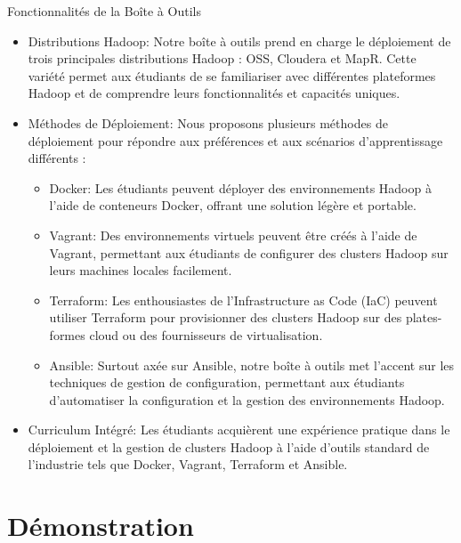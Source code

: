 \documentclass[tiny]{beamer}
\begin{document}
\begin{frame}[allowframebreaks, labels=]{Fonctionnalités de la Boîte à Outils}
\begin{itemize}
\item \alert{Distributions Hadoop:} Notre boîte à outils prend en charge le déploiement
de trois principales distributions Hadoop : OSS, Cloudera et MapR. Cette
variété permet aux étudiants de se familiariser avec différentes
plateformes Hadoop et de comprendre leurs fonctionnalités et capacités
uniques.
\item \alert{Méthodes de Déploiement:} Nous proposons plusieurs méthodes de déploiement
pour répondre aux préférences et aux scénarios d'apprentissage différents :
\begin{itemize}
\item \alert{Docker:} Les étudiants peuvent déployer des environnements Hadoop à l'aide
de conteneurs Docker, offrant une solution légère et portable.
\item \alert{Vagrant:} Des environnements virtuels peuvent être créés à l'aide de
Vagrant, permettant aux étudiants de configurer des clusters Hadoop sur
leurs machines locales facilement.
\item \alert{Terraform:} Les enthousiastes de l'Infrastructure as Code (IaC) peuvent
utiliser Terraform pour provisionner des clusters Hadoop sur des
plates-formes cloud ou des fournisseurs de virtualisation.
\item \alert{Ansible:} Surtout axée sur Ansible, notre boîte à outils met l'accent sur
les techniques de gestion de configuration, permettant aux étudiants
d'automatiser la configuration et la gestion des environnements Hadoop.
\end{itemize}
\item \alert{Curriculum Intégré:} Les étudiants acquièrent une expérience pratique dans
le déploiement et la gestion de clusters Hadoop à l'aide d'outils standard
de l'industrie tels que Docker, Vagrant, Terraform et Ansible.
\end{itemize}
\end{frame}




\section{Démonstration}
\label{sec:orgb60db12}
\end{document}
